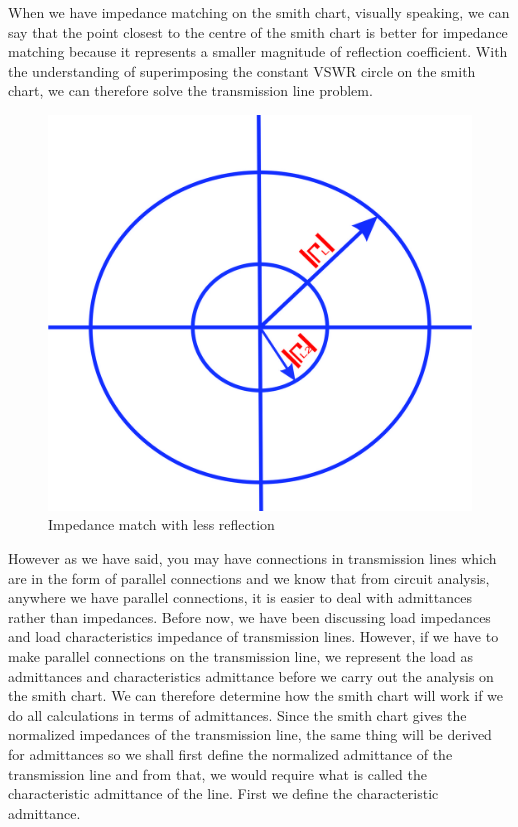 When we have impedance matching on the smith chart, visually speaking, we can say that the point closest to the centre of the smith chart is better for impedance matching because it represents a smaller magnitude of reflection coefficient. With the understanding of superimposing the constant VSWR circle on the smith chart, we can therefore solve the transmission line problem.
\begin{figure}[h]
\centering
\includegraphics[width=0.57\linewidth]{./graphics/poiuyfd}
\caption{Impedance match with less reflection}
\label{fig:poiuyfd}
\end{figure}

However as we have said, you may have connections in transmission lines which are in the form of parallel connections and we know that from circuit analysis, anywhere we have parallel connections, it is easier to deal with admittances rather than impedances. Before now, we have been discussing load impedances and load characteristics impedance of transmission lines. However, if we have to make parallel connections on the transmission line, we represent the load as admittances and characteristics admittance before we carry out the analysis on the smith chart. We can therefore determine how the smith chart will work if we do all calculations in terms of admittances. Since the smith chart gives the normalized impedances of the transmission line, the same thing will be derived for admittances so we shall first define the normalized admittance of the transmission line and from that, we would require what is called the characteristic admittance of the line. First we define the characteristic admittance.
